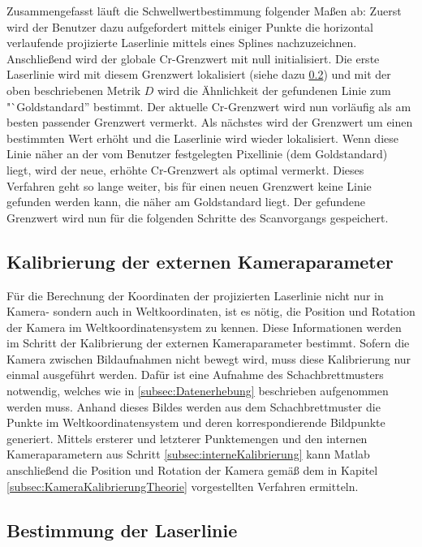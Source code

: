 \bigbreak
Zusammengefasst läuft die Schwellwertbestimmung folgender Maßen ab: Zuerst wird der Benutzer dazu aufgefordert mittels einiger Punkte die horizontal verlaufende projizierte Laserlinie mittels eines Splines nachzuzeichnen. Anschließend wird der globale Cr-Grenzwert mit null initialisiert. Die erste Laserlinie wird mit diesem Grenzwert lokalisiert (siehe dazu \ref{subsec:LaserLinieBestimmung}) und mit der oben beschriebenen Metrik \(D\) wird die Ähnlichkeit der gefundenen Linie zum "`Goldstandard'' bestimmt. Der aktuelle Cr-Grenzwert wird nun vorläufig als am besten passender Grenzwert vermerkt. Als nächstes wird der Grenzwert um einen bestimmten Wert erhöht und die Laserlinie wird wieder lokalisiert. Wenn diese Linie näher an der vom Benutzer festgelegten Pixellinie (dem Goldstandard) liegt, wird der neue, erhöhte Cr-Grenzwert als optimal vermerkt. Dieses Verfahren geht so lange weiter, bis für einen neuen Grenzwert keine Linie gefunden werden kann, die näher am Goldstandard liegt. Der gefundene Grenzwert wird nun für die folgenden Schritte des Scanvorgangs gespeichert.


\subsection{Kalibrierung der externen Kameraparameter}
\label{subsec:externeKalibrierung}
Für die Berechnung der Koordinaten der projizierten Laserlinie nicht nur in Kamera- sondern auch in Weltkoordinaten, ist es nötig, die Position und Rotation der Kamera im Weltkoordinatensystem zu kennen. Diese Informationen werden im Schritt der Kalibrierung der externen Kameraparameter bestimmt. Sofern die Kamera zwischen Bildaufnahmen nicht bewegt wird, muss diese Kalibrierung nur einmal ausgeführt werden. Dafür ist eine Aufnahme des Schachbrettmusters notwendig, welches wie in \ref{subsec:Datenerhebung} beschrieben aufgenommen werden muss. Anhand dieses Bildes werden aus dem Schachbrettmuster die Punkte im Weltkoordinatensystem und deren korrespondierende Bildpunkte generiert. Mittels ersterer und letzterer Punktemengen und den internen Kameraparametern aus Schritt \ref{subsec:interneKalibrierung} kann Matlab anschließend die Position und Rotation der Kamera gemäß dem in Kapitel \ref{subsec:KameraKalibrierungTheorie} vorgestellten Verfahren ermitteln.

\subsection{Bestimmung der Laserlinie}
\label{subsec:LaserLinieBestimmung}


